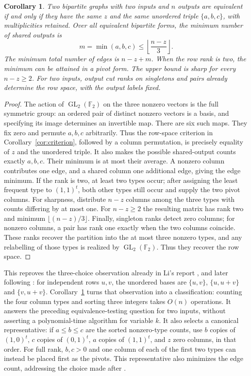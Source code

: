 \documentclass[11pt]{article}
\newtheorem{corollary}[theorem]{Corollary}
\newcommand{\F}{\mathbb F_2}
\newcommand{\GL}{\operatorname{GL}}
\begin{document}
\begin{corollary}\label{cor:two}
Two bipartite graphs with two inputs and $n$ outputs are equivalent if
and only if they have the same $z$ and the same unordered triple
$\{a,b,c\}$, with multiplicities retained. Over all equivalent bipartite
forms, the minimum number of shared outputs is
\[
 m=\min(a,b,c)\leq\left\lfloor\frac{n-z}{3}\right\rfloor.
\]
The minimum total number of edges is $n-z+m$.
When the row rank is two, the minimum can be attained in a pivot form.
The upper bound is sharp for every $n-z\geq2$.
For two inputs, output cut ranks on singletons and pairs already determine
the row space, with the output labels fixed.
\end{corollary}
\begin{proof}
The action of $\GL_2(\F)$ on the three nonzero vectors is the full
symmetric group: an ordered pair of distinct nonzero vectors is a basis,
and specifying its image determines an invertible map. There are six such
maps. They fix zero and permute $a,b,c$ arbitrarily. Thus the row-space
criterion in Corollary~\ref{cor:criterion}, followed by a column permutation,
is precisely equality of $z$ and the unordered triple. It also makes the
possible shared-output counts exactly $a,b,c$. Their minimum is at most
their average. A nonzero column contributes one edge, and a shared column
one additional edge, giving the edge minimum. If the rank is two, at least two types occur; after assigning
the least frequent type to $(1,1)^t$, both other types still occur and supply
the two pivot columns. For sharpness, distribute $n-z$ columns among the
three types with counts differing by at most one. For $n-z\geq2$ the
resulting matrix has rank two and minimum $\lfloor(n-z)/3\rfloor$.
Finally, singleton ranks detect zero columns; for nonzero columns, a pair
has rank one exactly when the two columns coincide. These ranks recover
the partition into the at most three nonzero types, and any relabelling
of those types is realized by $\GL_2(\F)$. Thus they recover the row space.
\end{proof}

This reproves the three-choice observation already in Li's report
\cite[Section VII, p.~20, after Claim G]{Li}, and later following
\cite[Proposition 8.2, p.~23]{KL}: for independent rows $u,v$, the
unordered bases are $\{u,v\}$, $\{u,u+v\}$ and $\{v,u+v\}$.
Corollary~\ref{cor:two} turns that observation into a classification:
counting the four column types and sorting three integers takes $O(n)$
operations. It answers the preceding equivalence-testing question for two
inputs, without asserting a polynomial-time algorithm for variable $k$.
It also selects a canonical representative: if $a\leq b\leq c$ are the
sorted nonzero-type counts, use $b$ copies of $(1,0)^t$, $c$ copies of
$(0,1)^t$, $a$ copies of $(1,1)^t$, and $z$ zero columns, in that order.
For full rank, $b,c>0$ and one column of each of the first two types can
instead be placed first as the pivots.
This representative also minimizes the edge count, addressing the choice
made after \cite[Proposition 8.1, p.~22]{KL}.
\end{document}
